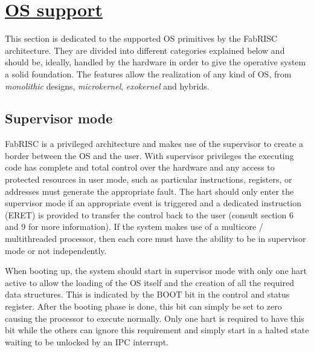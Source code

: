 \section[OS support]{\LARGE\underline{OS support}}

    \vspace{10pt}

    This section is dedicated to the supported OS primitives by the FabRISC architecture. They are divided into different categories explained below and should be, ideally, handled by the hardware in order to give the operative system a solid foundation. The features allow the realization of any kind of OS, from \textit{monolithic} designs, \textit{microkernel}, \textit{exokernel} and hybrids.

    \subsection{Supervisor mode}

        \vspace{10pt}

        FabRISC is a privileged architecture and makes use of the supervisor to create a border between the OS and the user. With supervisor privileges the executing code has complete and total control over the hardware and any access to protected resources in user mode, such as particular instructions, registers, or addresses must generate the appropriate fault. The hart should only enter the supervisor mode if an appropriate event is triggered and a dedicated instruction (ERET) is provided to transfer the control back to the user (consult section 6 and 9 for more information). If the system makes use of a multicore / multithreaded processor, then each core must have the ability to be in supervisor mode or not independently.

        \vspace{10pt}

        When booting up, the system should start in supervisor mode with only one hart active to allow the loading of the OS itself and the creation of all the required data structures. This is indicated by the BOOT bit in the control and status register. After the booting phase is done, this bit can simply be set to zero causing the processor to execute normally. Only one hart is required to have this bit while the others can ignore this requirement and simply start in a halted state waiting to be unlocked by an IPC interrupt.

